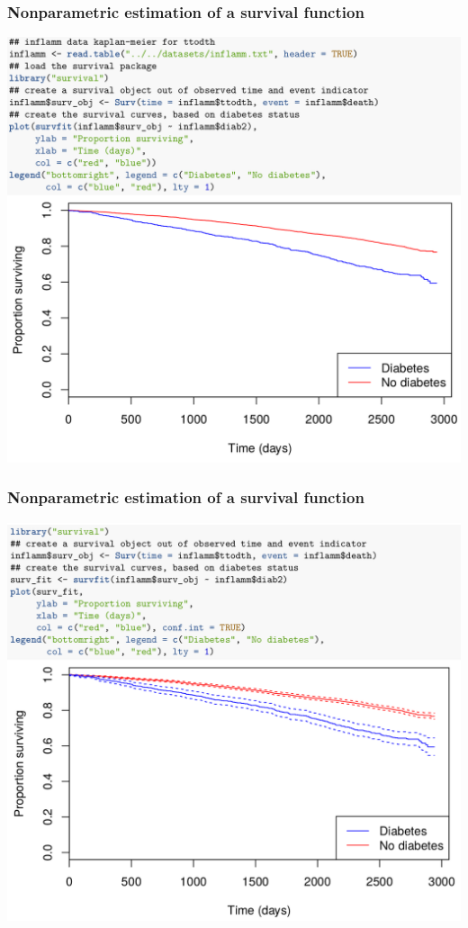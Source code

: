 \documentclass[12pt, 
hyperref={colorlinks=true, linkcolor=blue, urlcolor=cyan},dvipsnames]{beamer}
\begin{document}
\begin{frame}
\frametitle{Nonparametric estimation of a survival function}
\centering
\includegraphics[height=0.95\textheight]{figs/inflamm_km.png}
\end{frame}

\begin{frame}
\frametitle{Nonparametric estimation of a survival function}
\centering
\includegraphics[height=0.95\textheight]{figs/inflamm_km_cis.png}
\end{frame}
\end{document}
